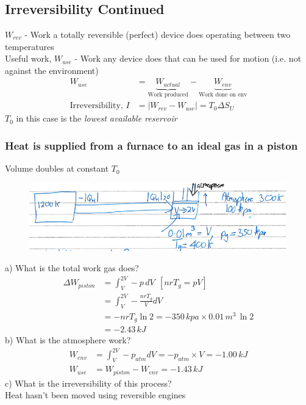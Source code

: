 \documentclass[a4paper, 11pt, normalem]{report}
\begin{document}
\chapter{}
\section{Irreversibility Continued}
$W_{rev}$ - Work a totally reversible (perfect) device does operating between two temperatures \\
Useful work, $W_{use}$ - Work any device does that can be used for motion (i.e. not against the environment)
\begin{align*}
    W_{use} &= \underbrace{W_{actual}}_{\text{Work produced}} - \underbrace{W_{env}}_{\text{Work done on env}} \\
    \text{Irreversibility, }I &= |W_{rev} - W_{use}| = T_0 \Delta S_U
\end{align*}
$T_0$ in this case is the \textit{lowest available reservoir}

\subsection{Heat is supplied from a furnace to an ideal gas in a piston}
Volume doubles at constant $T_0$
\begin{figure}[H]
    \centering
    \includegraphics[scale=0.5]{Ex132.png}
\end{figure}
a) What is the total work gas does?
\begin{align*}
    \Delta W_{piston} &= \int_{V}^{2V} -p\,dV ~~[nrT_g = pV] \\
    &= \int_{V}^{2V} -\frac{nrT_g}{V}dV \\
    &= -nrT_g \ln2 = -350\,kpa \times 0.01\,m^3\,\ln2 \\
    &= -2.43\,kJ
\end{align*}
b) What is the atmosphere work?
\begin{align*}
    W_{env} &= \int_{V}^{2V} -p_{atm}dV = -p_{atm} \times V = -1.00\,kJ \\
    W_{use} &= W_{piston} - W_{env} = -1.43\,kJ
\end{align*}
c) What is the irreversibility of this process? \\
Heat hasn't been moved using reversible engines
\end{document}
